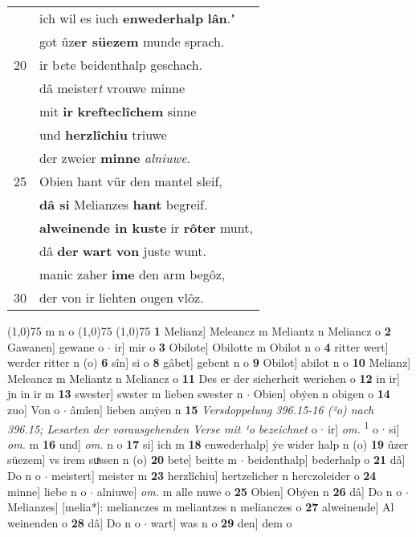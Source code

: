 \documentclass[8pt,a4paper,notitlepage]{article}
\begin{document}
\begin{table}[ht]
\begin{minipage}[t]{0.5\linewidth}
\begin{tabular}{rl}
 & ich wil es iuch \textbf{enwederhalp} \textbf{lân}."\\ 
 & got ûz\textbf{er süezem} munde sprach.\\ 
20 & ir b\textit{e}te beidenthalp geschach.\\ 
 & dâ meister\textit{t} vrouwe minne\\ 
 & mit \textbf{ir} \textbf{krefteclîchem} sinne\\ 
 & und \textbf{herzlîchiu} triuwe\\ 
 & der zweier \textbf{minne} \textit{alniuwe}.\\ 
25 & Obien hant vür den mantel sleif,\\ 
 & \textbf{dâ si} Melianzes \textbf{hant} begreif.\\ 
 & \textbf{alweinende in kuste} ir \textbf{rôter} munt,\\ 
 & dâ \textbf{der} \textbf{wart} \textbf{von} juste wunt.\\ 
 & manic zaher \textbf{ime} den arm begôz,\\ 
30 & der von ir liehten ougen vlôz.\\ 
\end{tabular}
\scriptsize
\line(1,0){75} \newline
m n o \newline
\line(1,0){75} \newline
\newline
\line(1,0){75} \newline
\textbf{1} Melianz] Meleancz m Meliantz n Meliancz o \textbf{2} Gawanen] gewane o  $\cdot$ ir] mir o \textbf{3} Obilote] Obilotte m Obilot n o \textbf{4} ritter wert] werder ritter n (o) \textbf{6} sîn] si o \textbf{8} gâbet] gebent n o \textbf{9} Obilot] abilot n o \textbf{10} Melianz] Meleancz m Meliantz n Meliancz o \textbf{11} Des er der sicherheit weriehen o \textbf{12} in ir] jn in ir m \textbf{13} swester] swster m lieben swester n  $\cdot$ Obien] obẏen n obigen o \textbf{14} zuo] Von o  $\cdot$ âmîen] lieben amẏen n \textbf{15} \textit{Versdoppelung 396.15-16 (²o) nach 396.15; Lesarten der vorausgehenden Verse mit ¹o bezeichnet} o   $\cdot$ ir] \textit{om.} \textsuperscript{1}\hspace{-1.3mm} o  $\cdot$ si] \textit{om.} m \textbf{16} und] \textit{om.} n o \textbf{17} si] ich m \textbf{18} enwederhalp] ẏe wider halp n (o) \textbf{19} ûzer süezem] vs irem suͯssen n (o) \textbf{20} bete] beitte m  $\cdot$ beidenthalp] bederhalp o \textbf{21} dâ] Do n o  $\cdot$ meistert] meister m \textbf{23} herzlîchiu] hertzelicher n herczoleider o \textbf{24} minne] liebe n o  $\cdot$ alniuwe] \textit{om.} m alle nuwe o \textbf{25} Obien] Obẏen n \textbf{26} dâ] Do n o  $\cdot$ Melianzes] [melia*]: melianczes m meliantzes n melianczes o \textbf{27} alweinende] Al weinenden o \textbf{28} dâ] Do n o  $\cdot$ wart] was n o \textbf{29} den] dem o \newline
\end{minipage}
\end{table}
\end{document}
